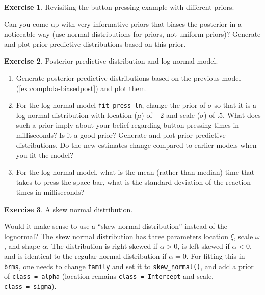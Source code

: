 \documentclass[12pt,]{krantz}
\providecommand{\tightlist}{%
  \setlength{\itemsep}{0pt}\setlength{\parskip}{0pt}}
\theoremstyle{definition}
\theoremstyle{definition}
\theoremstyle{definition}
\newtheorem{exercise}{Exercise}[chapter]
\theoremstyle{remark}
\begin{document}
\begin{exercise}
\protect\hypertarget{exr:compbda-biasedpost}{}{\label{exr:compbda-biasedpost} }Revisiting the button-pressing example with different priors.
\end{exercise}

\vspace{-.5cm}

Can you come up with very informative priors that biases the posterior in a noticeable way (use normal distributions for priors, not uniform priors)? Generate and plot prior predictive distributions based on this prior.

\begin{exercise}
\protect\hypertarget{exr:ppd}{}{\label{exr:ppd} }Posterior predictive distribution and log-normal model.
\end{exercise}

\vspace{-.5cm}

\begin{enumerate}
\def\labelenumi{\alph{enumi}.}
\tightlist
\item
  Generate posterior predictive distributions based on the previous model (\ref{ex:compbda-biasedpost}) and plot them.
\item
  For the log-normal model \texttt{fit\_press\_ln}, change the prior of \(\sigma\) so that it is a log-normal distribution with location (\(\mu\)) of \(-2\) and scale (\(\sigma\)) of \(.5\). What does such a prior imply about your belief regarding button-pressing times in milliseconds? Is it a good prior? Generate and plot prior predictive distributions. Do the new estimates change compared to earlier models when you fit the model?
\item
  For the log-normal model, what is the mean (rather than median) time that takes to press the space bar, what is the standard deviation of the reaction times in milliseconds?
\end{enumerate}

\begin{exercise}
\protect\hypertarget{exr:skew}{}{\label{exr:skew} }A skew normal distribution.
\end{exercise}

Would it make sense to use a ``skew normal distribution'' instead of the lognormal? The skew normal distribution has three parameters location \(\xi\), scale \(\omega\), and shape \(\alpha\). The distribution is right skewed if \(\alpha >0\), is left skewed if \(\alpha <0\), and is identical to the regular normal distribution if \(\alpha =0\). For fitting this in \texttt{brms}, one needs to change \texttt{family} and set it to \texttt{skew\_normal()}, and add a prior of \texttt{class\ =\ alpha} (location remains \texttt{class\ =\ Intercept} and scale, \texttt{class\ =\ sigma}).
\end{document}
